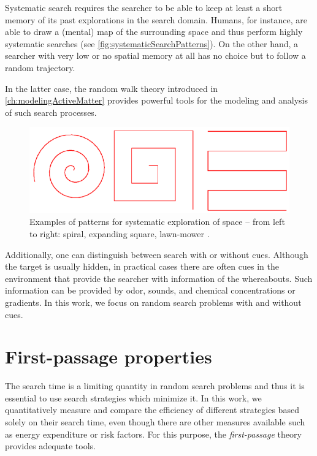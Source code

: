 Systematic search requires the searcher to be able to keep at least a short memory of its past explorations in the search domain. Humans, for instance, are able to draw a (mental) map of the surrounding space and thus perform highly systematic searches (see \autoref{fig:systematicSearchPatterns}). On the other hand, a searcher with very low or no spatial memory at all has no choice but to follow a random trajectory.

In the latter case, the random walk theory introduced in \autoref{ch:modelingActiveMatter} provides powerful tools for the modeling and analysis of such search processes.

\begin{figure}[bth]
 \myfloatalign
 \includegraphics[width=0.8\linewidth]{gfx/systematicSearchPatterns}
 \caption[Patterns of systematic search]{Examples of patterns for systematic exploration of space -- from left to right: spiral, expanding square, lawn-mower \cite{benichou:2011}.}\label{fig:systematicSearchPatterns}
\end{figure}

Additionally, one can distinguish between search with or without cues. Although the target is usually hidden, in practical cases there are often cues in the environment that provide the searcher with information of the whereabouts. Such information can be provided by \eg odor, sounds, and chemical concentrations or gradients. In this work, we focus on random search problems with and without cues.

\section{First-passage properties}
The search time is a limiting quantity in random search problems and thus it is essential to use search strategies which minimize it. In this work, we quantitatively measure and compare the efficiency of different strategies based solely on their search time, even though there are other measures available such as \eg energy expenditure or risk factors.  For this purpose, the \textit{first-passage} theory provides adequate tools.

